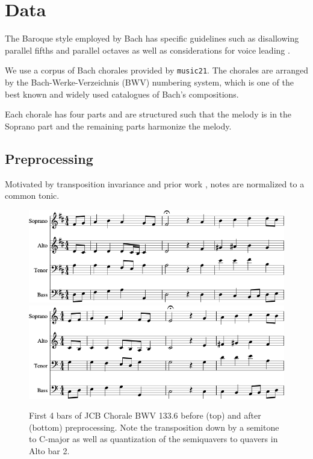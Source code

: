 \documentclass[dissertation.tex]{subfiles}
\begin{document}
\chapter{Data}

The Baroque style employed by Bach has specific guidelines
such as disallowing parallel fifths and parallel octaves as well as
considerations for voice leading \cite{piston1978harmony}.



We use a corpus of Bach chorales provided by \texttt{music21}. The chorales are
arranged by the Bach-Werke-Verzeichnis (BWV) numbering system, which is one of
the best known and widely used catalogues of Bach's compositions.

Each chorale has four parts and are structured such that the melody is in
the Soprano part and the remaining parts harmonize the melody.

\section{Preprocessing}

Motivated by transposition invariance and prior work \cite{mozer1994}, notes are
normalized to a common tonic.

\begin{figure}[htbp]
    \centering
    \includegraphics[width=1.0\linewidth]{Figures/bwv133-6-original-score-1.png}
    \includegraphics[width=1.0\linewidth]{Figures/bwv133-6-preproc-score-1.png}
    \caption{First 4 bars of JCB Chorale BWV 133.6 before (top) and after (bottom) preprocessing. Note
    the transposition down by a semitone to C-major as well as quantization of the
    semiquavers to quavers in Alto bar 2.}
    \label{fig:score-effects-preproc}
\end{figure}
\end{document}
